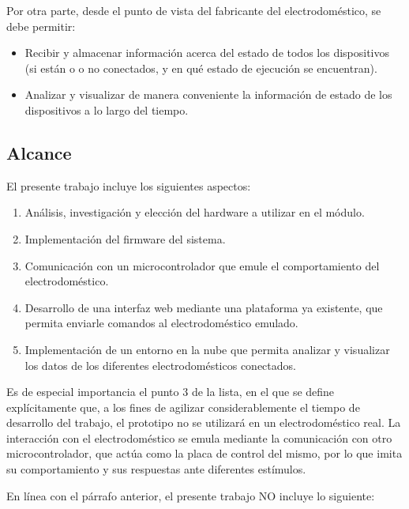 Por otra parte, desde el punto de vista del fabricante del electrodoméstico, se debe permitir:
\begin{itemize}
	\item Recibir y almacenar información acerca del estado de todos los dispositivos (si están o o no conectados, y en qué estado de ejecución se encuentran).
	\item Analizar y visualizar de manera conveniente la información de estado de los dispositivos a lo largo del tiempo.
\end{itemize}

\subsection{Alcance}

El presente trabajo incluye los siguientes aspectos:

\begin{enumerate}
	\item Análisis, investigación y elección del hardware a utilizar en el módulo.
	\item Implementación del firmware del sistema.
	\item Comunicación con un microcontrolador que emule el comportamiento del electrodoméstico.
	\item Desarrollo de una interfaz web mediante una plataforma ya existente, que permita enviarle comandos al electrodoméstico emulado.
	\item Implementación de un entorno en la nube que permita analizar y visualizar los datos de los diferentes electrodomésticos conectados.
\end{enumerate}

Es de especial importancia el punto 3 de la lista, en el que se define explícitamente que, a los fines de agilizar considerablemente el tiempo de desarrollo del trabajo, el prototipo no se utilizará en un electrodoméstico real. La interacción con el electrodoméstico se emula mediante la comunicación con otro microcontrolador, que actúa como la placa de control del mismo, por lo que imita su comportamiento y sus respuestas ante diferentes estímulos.

En línea con el párrafo anterior, el presente trabajo NO incluye lo siguiente:

